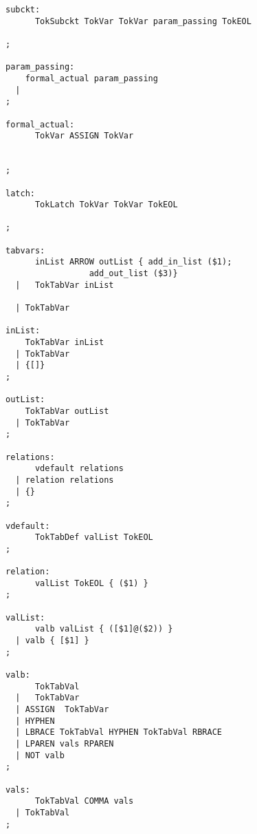 \begin{minipage}[t]{2in}
\scriptsize
\begin{verbatim}
subckt:
      TokSubckt TokVar TokVar param_passing TokEOL

;

param_passing:
    formal_actual param_passing
  |
;

formal_actual:
      TokVar ASSIGN TokVar


;

latch:
      TokLatch TokVar TokVar TokEOL

;

tabvars:
      inList ARROW outList { add_in_list ($1);
                 add_out_list ($3)}
  |   TokTabVar inList

  | TokTabVar

inList:
    TokTabVar inList
  | TokTabVar
  | {[]}
;

outList:
    TokTabVar outList
  | TokTabVar
;

relations:
      vdefault relations
  | relation relations
  | {}
;

vdefault:
      TokTabDef valList TokEOL
;

relation:
      valList TokEOL { ($1) }
;

valList:
      valb valList { ([$1]@($2)) }
  | valb { [$1] }
;

valb:
      TokTabVal
  |   TokTabVar
  | ASSIGN  TokTabVar
  | HYPHEN
  | LBRACE TokTabVal HYPHEN TokTabVal RBRACE
  | LPAREN vals RPAREN
  | NOT valb
;

vals:
      TokTabVal COMMA vals
  | TokTabVal
;
\end{verbatim}
\end{minipage}

